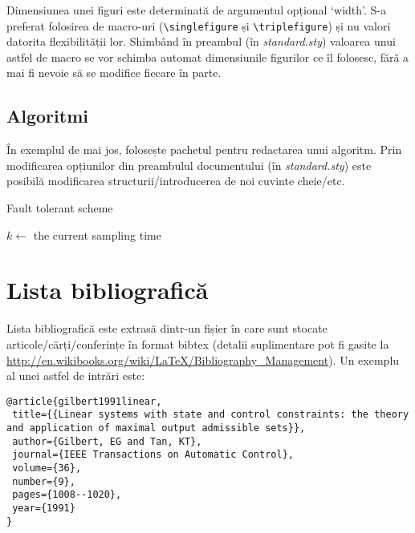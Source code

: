 \begin{rem}
Dimensiunea unei figuri este determinată de argumentul opțional `width'. S-a preferat folosirea de macro-uri (\verb+\singlefigure+ și \verb+\triplefigure+) și nu valori  datorita flexibilității lor. Shimbând în preambul (în \emph{standard.sty}) valoarea unui astfel de macro se vor schimba automat dimensiunile figurilor ce îl folosesc, fără a mai fi nevoie să se modifice fiecare în parte. \eor
\end{rem}

\subsection{Algoritmi}

În exemplul de mai jos,  folosește pachetul  pentru redactarea unui algoritm. Prin modificarea opțiunilor din preambulul documentului (în \emph{standard.sty}) este posibilă modificarea structurii/introducerea de noi cuvinte cheie/etc.

\begin{algorithm2e}
\caption{Fault tolerant scheme}
\label{alg:run}
$k \leftarrow$ the current sampling time\;
\end{algorithm2e}

\section{Lista bibliografică}

Lista bibliografică este extrasă dintr-un fișier  în care sunt stocate articole/cărți/conferințe în format bibtex (detalii suplimentare pot fi gasite la \url{http://en.wikibooks.org/wiki/LaTeX/Bibliography_Management}). Un exemplu al unei astfel de intrări este:


\begin{verbatim}
@article{gilbert1991linear,
 title={{Linear systems with state and control constraints: the theory and application of maximal output admissible sets}},
 author={Gilbert, EG and Tan, KT},
 journal={IEEE Transactions on Automatic Control},
 volume={36},
 number={9},
 pages={1008--1020},
 year={1991}
}
\end{verbatim}

